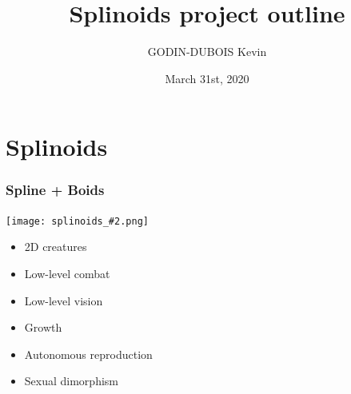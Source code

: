 \documentclass[
auto_sections,
monitor_progress,
draft
]{mannbeamer}
\title{Splinoids project outline}
\author{GODIN-DUBOIS Kevin}
\date{March 31st, 2020}
\begin{document}
\dotitlepage

\newcommand{\splinoid}[2][]{\texttt{[image: splinoids\_\#2.png]}}
\section{Splinoids}

\begin{frame}[ok]
 \frametitle{Spline + Boids}
 \centering
 \begin{minipage}{.49\textwidth}
  \splinoid[width=\textwidth, height=.8\textheight, keepaspectratio]{large}
 \end{minipage}
 \begin{minipage}{.49\textwidth}
  \begin{itemize}
   \item 2D creatures
   \item Low-level combat
   \item Low-level vision
   \item Growth
   \item Autonomous reproduction
   \item Sexual dimorphism
  \end{itemize}
 \end{minipage}
\end{frame}
\end{document}
